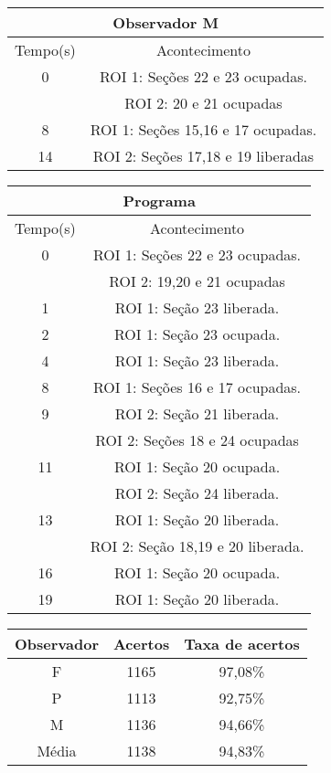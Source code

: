 \begin{center}
\begin{tabular}{|c||c|}
\hline
\multicolumn{2}{|c|}{Observador M}  \\ \hline \hline
Tempo(s) & Acontecimento \\ \hline
0 & ROI 1: Seções 22 e 23 ocupadas. \\
 & ROI 2: 20 e 21 ocupadas \\ \hline
8 & ROI 1: Seções 15,16 e 17 ocupadas. \\ \hline
14 & ROI 2: Seções 17,18 e 19 liberadas \\
\hline
\end{tabular}
\end{center}

\begin{center}
\begin{tabular}{|c||c|}
\hline
\multicolumn{2}{|c|}{Programa}  \\ \hline \hline
Tempo(s) & Acontecimento \\ \hline
0 & ROI 1: Seções 22 e 23 ocupadas. \\
 & ROI 2: 19,20 e 21 ocupadas \\ \hline
1 & ROI 1: Seção 23 liberada. \\ \hline
2 & ROI 1: Seção 23 ocupada. \\ \hline
4 & ROI 1: Seção 23 liberada. \\ \hline
8 & ROI 1: Seções 16 e 17 ocupadas. \\ \hline
9 & ROI 2: Seção 21 liberada. \\ 
 & ROI 2: Seções 18 e 24 ocupadas \\ \hline
11 & ROI 1: Seção 20 ocupada. \\ 
 & ROI 2: Seção 24 liberada. \\ \hline
13 & ROI 1: Seção 20 liberada. \\
 & ROI 2: Seção 18,19 e 20 liberada. \\ \hline
16 & ROI 1: Seção 20 ocupada. \\ \hline
19 & ROI 1: Seção 20 liberada. \\
\hline
\end{tabular}
\end{center}

\begin{center}
\begin{tabular}{|c||c||c|}
\hline
Observador & Acertos & Taxa de acertos \\ \hline
F & 1165 & 97,08\% \\  \hline
P & 1113 & 92,75\% \\ \hline
M & 1136 & 94,66\% \\ \hline
Média & 1138 & 94,83\% \\
\hline
\end{tabular}
\end{center}


